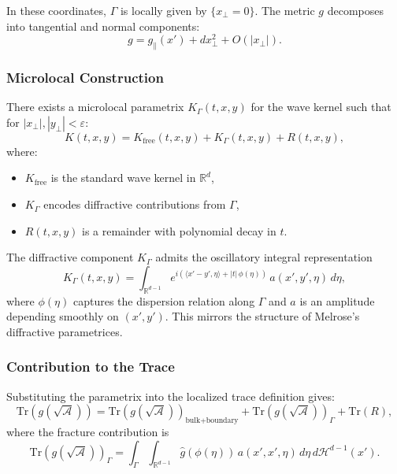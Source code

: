 In these coordinates, $\Gamma$ is locally given by $\{x_\perp = 0\}$.
The metric $g$ decomposes into tangential and normal components:
\[
g = g_{\parallel}(x') + dx_\perp^2 + O(|x_\perp|).
\]


\subsubsection{Microlocal Construction}

\begin{proposition}
\label{prop:parametrix}
There exists a microlocal parametrix $K_\Gamma(t,x,y)$ for the wave kernel
such that for $|x_\perp|, |y_\perp| < \varepsilon$:
\[
K(t,x,y) = K_{\text{free}}(t,x,y) + K_\Gamma(t,x,y) + R(t,x,y),
\]
where:
\begin{itemize}
\item $K_{\text{free}}$ is the standard wave kernel in $\mathbb{R}^d$,
\item $K_\Gamma$ encodes diffractive contributions from $\Gamma$,
\item $R(t,x,y)$ is a remainder with polynomial decay in $t$.
\end{itemize}
\end{proposition}

\begin{remark}
The diffractive component $K_\Gamma$ admits the oscillatory integral representation
\[
K_\Gamma(t,x,y) = \int_{\mathbb{R}^{d-1}} e^{i(\langle x'-y',\eta\rangle + |t|\,\phi(\eta))}
\,a(x',y',\eta)\,d\eta,
\]
where $\phi(\eta)$ captures the dispersion relation along $\Gamma$
and $a$ is an amplitude depending smoothly on $(x',y')$.
This mirrors the structure of Melrose’s diffractive parametrices.
\end{remark}


\subsubsection{Contribution to the Trace}

Substituting the parametrix into the localized trace definition gives:
\[
\mathrm{Tr}(g(\sqrt{\mathcal{A}})) =
\mathrm{Tr}(g(\sqrt{\mathcal{A}}))_{\text{bulk+boundary}}
+ \mathrm{Tr}(g(\sqrt{\mathcal{A}}))_{\Gamma}
+ \mathrm{Tr}(R),
\]
where the fracture contribution is
\[
\mathrm{Tr}(g(\sqrt{\mathcal{A}}))_{\Gamma}
= \int_\Gamma \int_{\mathbb{R}^{d-1}}
\widehat{g}(\phi(\eta))\,a(x',x',\eta)\,d\eta\,d\mathcal{H}^{d-1}(x').
\]

